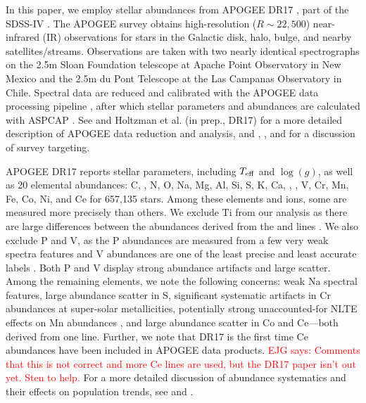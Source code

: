 \documentclass[modern]{aastex631}
\newcommand{\logg}{\log(g)}
\newcommand{\teff}{T_{\rm eff}}
\newcommand{\ejg}[1]{\textcolor{red}{EJG says: #1}}
\begin{document}
In this paper, we employ stellar abundances from APOGEE DR17 \citep{abdurrouf2022}, part of the SDSS-IV \citep{majewski2017}. The APOGEE survey obtains high-resolution ($R\sim22,500$) near-infrared (IR) observations \citep{wilson2019} for stars in the Galactic disk, halo, bulge, and nearby satellites/streams. Observations are taken with two nearly identical spectrographs on the 2.5m Sloan Foundation telescope \citep{wilson2019} at Apache Point Observatory in New Mexico and the 2.5m du Pont Telescope \citep{bowen1973} at the Las Campanas Observatory in Chile. Spectral data are reduced and calibrated with the APOGEE data processing pipeline \citep{nidever2015}, after which stellar parameters and abundances are calculated with ASPCAP \citep[APOGEE Stellar Parameter and Chemical Abundance Pipeline;][]{holtzman2015, garcia2016}. See \citet[][DR16]{jonsson2020} and Holtzman et al. (in prep., DR17) for a more detailed description of APOGEE data reduction and analysis, and \citet{zasowski2013, zasowski2017}, \citet{beaton2021}, and \citet{santana2021} for a discussion of survey targeting.

APOGEE DR17 reports stellar parameters, including $\teff$ and $\logg$, as well as 20 elemental abundances: C, , N, O, Na, Mg, Al, Si, S, K, Ca, , , V, Cr, Mn, Fe, Co, Ni, and Ce for 657,135 stars. Among these elements and ions, some are measured more precisely than others. We exclude Ti from our analysis as there are large differences between the abundances derived from the  and  lines \citep{jonsson2020}. We also exclude P and V, as the P abundances are measured from a few very weak spectra features and V abundances are one of the least precise and least accurate labels \citep{jonsson2020}. Both P and V display strong abundance artifacts and large scatter. Among the remaining elements, we note the following concerns: weak Na spectral features, large abundance scatter in S, significant systematic artifacts in Cr abundances at super-solar metallicities, potentially strong unaccounted-for NLTE effects on Mn abundances \citep{bergemann2019}, and large abundance scatter in Co and Ce---both derived from one line. Further, we note that DR17 is the first time Ce abundances have been included in APOGEE data products. \ejg{Comments that this is not correct and more Ce lines are used, but the DR17 paper isn't out yet. Sten to help.} For a more detailed discussion of abundance systematics and their effects on population trends, see \citet{jonsson2020} and \citet{griffith2021a}.
\end{document}

